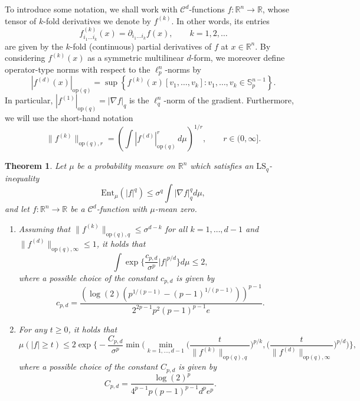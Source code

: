 \documentclass[a4paper,12pt]{amsart}
\numberwithin{equation}{section}
\newtheorem{satz}{Theorem}[section]
\theoremstyle{remark}
\def\R{{\mathbb R}}
\def\S{{\mathbb S}}
\begin{document}
To introduce some notation, we shall work with $\mathcal{C}^d$-functions $f \colon \R^n \to \R$, whose tensor of $k$-fold derivatives we denote by $f^{(k)}$. In other words, its entries
\begin{equation}
\label{Hesseallgem}
f^{(k)}_{i_1 \ldots i_k}(x) = \partial_{i_1 \ldots i_k} f(x), \qquad k = 1,2,\dots
\end{equation}
are given by the $k$-fold (continuous) partial derivatives of $f$ at $x \in \R^n$. By considering $f^{(k)}(x)$ as a symmetric multilinear $d$-form, we moreover define operator-type norms with respect to the $\ell_p^n$-norms by
\begin{equation}
\label{Operatornorm}
|f^{(d)}(x)|_{\mathrm{op}(q)} = \sup \left\{ f^{(k)}(x)[v_1, \ldots, v_k] \colon v_1, \ldots, v_k \in \S_p^{n-1}\right\}.
\end{equation}
In particular, $|f^{(1)}|_{\mathrm{op}(q)} = |\nabla f|_q$ is the $\ell_q^n$-norm of the gradient. Furthermore, we will use the short-hand notation
\begin{equation}
\label{Lpnorm}
\lVert f^{(k)} \rVert_{\mathrm{op}(q), r} =
\left(\int |f^{(d)}|_{\mathrm{op}(q)}^r\, d\mu\right)^{1/r}, \qquad r \in (0, \infty].
\end{equation}

\begin{satz}\label{HOLqRn}
    Let $\mu$ be a probability measure on $\R^n$ which satisfies an $\mathrm{LS}_q$-inequality
    \[
    \mathrm{Ent}_{\mu}(|f|^q) \le \sigma^q \int |\nabla f|_q^q d\mu,
    \]
    and let $f\colon \R^n \to \R$ be a $\mathcal{C}^d$-function with $\mu$-mean zero.
    \begin{enumerate}
        \item Assuming that $\lVert f^{(k)} \rVert_{\mathrm{op}(q),q} \le \sigma^{d-k}$ for all $k=1,\ldots,d-1$ and $\lVert f^{(d)} \rVert_{\mathrm{op}(q),\infty} \le 1$, it holds that
        \[
        \int \exp\Big\{\frac{c_{p,d}}{\sigma^p} |f|^{p/d} \Big\} d\mu \le 2,
        \]
        where a possible choice of the constant $c_{p,d}$ is given by
        \[
        c_{p,d} = \frac{(\log(2)(p^{1/(p-1)}-(p-1)^{1/(p-1)}))^{p-1}}{2^{2p-1}p^2(p-1)^{p-1}e}.
        \]
        \item For any $t\ge 0$, it holds that
        \[
        \mu(|f| \ge t)\le
        2 \exp\Big\{- \frac{C_{p,d}}{\sigma^p} \min\Big(\min_{k=1, \ldots,d-1} \Big(\frac{t}{\lVert f^{(k)} \rVert_{\mathrm{op}(q),q}}\Big)^{p/k}, \Big(\frac{t}{\lVert f^{(d)} \rVert_{\mathrm{op}(q),\infty}}\Big)^{p/d}\Big)\Big\},
        \]
    where a possible choice of the constant $C_{p,d}$ is given by
    \[
    C_{p,d} = \frac{\log(2)^p}{4^{p-1}p(p-1)^{p-1}d^pe^p}.
    \]
    \end{enumerate}
\end{satz}
\end{document}
